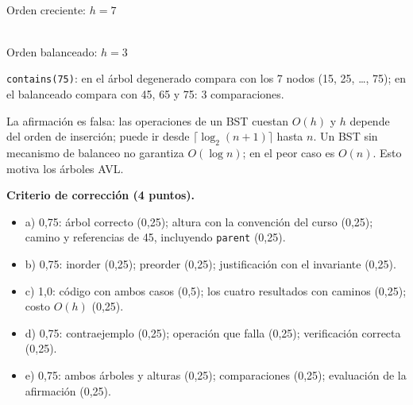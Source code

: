 \documentclass[11pt,a4paper]{article}
\begin{document}
\begin{center}
\begin{minipage}{0.45\textwidth}
\centering
{}\\[2pt]
{\small Orden creciente: $h = 7$}
\end{minipage}
\hfill
\begin{minipage}{0.5\textwidth}
\centering
{}\\[2pt]
{\small Orden balanceado: $h = 3$}
\end{minipage}
\end{center}

\texttt{contains(75)}: en el árbol degenerado compara con los 7 nodos (15, 25, \dots, 75); en el balanceado compara con 45, 65 y 75: 3 comparaciones.

La afirmación es falsa: las operaciones de un BST cuestan $O(h)$ y $h$ depende del orden de inserción; puede ir desde $\lceil \log_2(n+1) \rceil$ hasta $n$. Un BST sin mecanismo de balanceo no garantiza $O(\log n)$; en el peor caso es $O(n)$. Esto motiva los árboles AVL.

\textbf{Criterio de corrección (4 puntos).}
\begin{itemize}[itemsep=0pt]
\item a) 0,75: árbol correcto (0,25); altura con la convención del curso (0,25); camino y referencias de 45, incluyendo \texttt{parent} (0,25).
\item b) 0,75: inorder (0,25); preorder (0,25); justificación con el invariante (0,25).
\item c) 1,0: código con ambos casos (0,5); los cuatro resultados con caminos (0,25); costo $O(h)$ (0,25).
\item d) 0,75: contraejemplo (0,25); operación que falla (0,25); verificación correcta (0,25).
\item e) 0,75: ambos árboles y alturas (0,25); comparaciones (0,25); evaluación de la afirmación (0,25).
\end{itemize}
\end{document}
